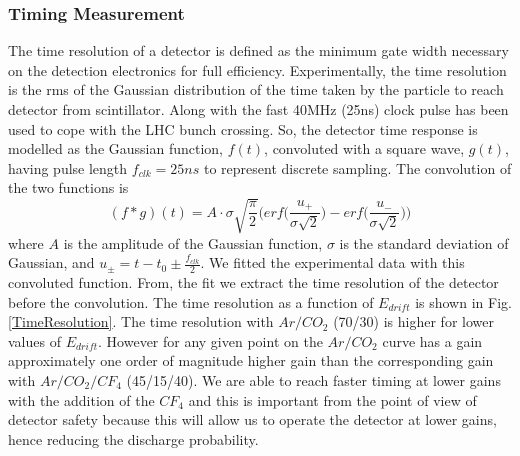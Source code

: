 \subsubsection{Timing Measurement}
The time resolution of a detector is defined as the minimum gate width necessary on the detection electronics for full efficiency.
Experimentally, the time resolution is the rms of the Gaussian distribution of the time taken by the particle to reach detector from scintillator.
Along with the fast 40MHz (25ns) clock pulse has been used to cope with the LHC bunch crossing. So, the detector time response is modelled as the Gaussian function, $f(t)$, convoluted with a square wave, $g(t)$, having pulse length $f_{clk}=25ns$ to represent discrete sampling. 
The convolution of the two functions is
\begin{equation}
(f*g)(t) = A \cdot \sigma \sqrt{\frac{\pi}{2}}\Big(erf\Big(\frac{u_{+}}{\sigma\sqrt{2}}\Big)-erf\Big(\frac{u_{-}}{\sigma\sqrt{2}}\Big)\Big)
\end{equation}
where $A$ is the amplitude of the Gaussian function, $\sigma$ is the standard deviation of Gaussian, and $u_{\pm}= t-t_0\pm\frac{f_{clk}}{2}$. 
We fitted the experimental data with this convoluted function. From, the fit we extract the time resolution of the detector before the convolution. The time resolution as a function of $E_{drift}$ is shown in Fig. \ref{TimeResolution}. The time resolution with $Ar/CO_2$ (70/30) is higher for lower values of $E_{drift}$. However for any given point on the $Ar/CO_2$ curve has a gain approximately one order of magnitude higher gain than the corresponding gain with $Ar/CO_2/CF_4$ (45/15/40).  We are able to reach faster timing at lower gains with the addition of the $CF_4$ and this is important from the point of view of detector safety because this will allow us to operate the detector at lower gains, hence reducing the discharge probability.

